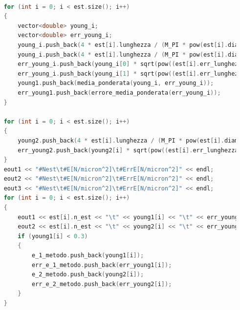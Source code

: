 \documentclass[a4paper,11pt,oneside]{article}
\begin{document}
\begin{lstlisting}[language=C++, label=lst:seconda_parte, caption=seconda\_parte]
	
	for (int i = 0; i < est.size(); i++)
	{
		vector<double> young_i;
		vector<double> err_young_i;
		young_i.push_back(4 * est[i].lunghezza / (M_PI * pow(est[i].diametro, 2) * est[i].coeff_ango_all));
		young_i.push_back(4 * est[i].lunghezza / (M_PI * pow(est[i].diametro, 2) * est[i].coeff_ango_acc));
		err_young_i.push_back(young_i[0] * sqrt(pow((est[i].err_lunghezza / est[i].lunghezza), 2) + pow((est[i].err_coeff_ango_all / est[i].coeff_ango_all), 2) + 4 * pow((est[i].err_diametro / est[i].diametro), 2))); 
		err_young_i.push_back(young_i[1] * sqrt(pow((est[i].err_lunghezza / est[i].lunghezza), 2) + pow((est[i].err_coeff_ango_acc / est[i].coeff_ango_acc), 2) + 4 * pow((est[i].err_diametro / est[i].diametro), 2)));
		young1.push_back(media_ponderata(young_i, err_young_i));
		err_young1.push_back(errore_media_ponderata(err_young_i));
	}
	
	for (int i = 0; i < est.size(); i++)
	{
		young2.push_back(4 * est[i].lunghezza / (M_PI * pow(est[i].diametro, 2) * est[i].k_medio));
		err_young2.push_back(young2[i] * sqrt(pow((est[i].err_lunghezza / est[i].lunghezza), 2) + pow((est[i].err_k_medio / est[i].k_medio), 2) + 4 * pow((est[i].err_diametro / est[i].diametro), 2)));
	}
	eout1 << "#Nest\t#E[N/micron^2]\t#ErrE[N/micron^2]" << endl;
	eout2 << "#Nest\t#E[N/micron^2]\t#ErrE[N/micron^2]" << endl;
	eout3 << "#Nest\t#E[N/micron^2]\t#ErrE[N/micron^2]" << endl;
	for (int i = 0; i < est.size(); i++)
	{
		eout1 << est[i].n_est << "\t" << young1[i] << "\t" << err_young1[i] << endl;
		eout2 << est[i].n_est << "\t" << young2[i] << "\t" << err_young2[i] << endl;
		if (young1[i] < 0.3) 
		{
			e_1_metodo.push_back(young1[i]);
			err_e_1_metodo.push_back(err_young1[i]);
			e_2_metodo.push_back(young2[i]);
			err_e_2_metodo.push_back(err_young2[i]);
		}
	}
	

\end{lstlisting}
\end{document}
